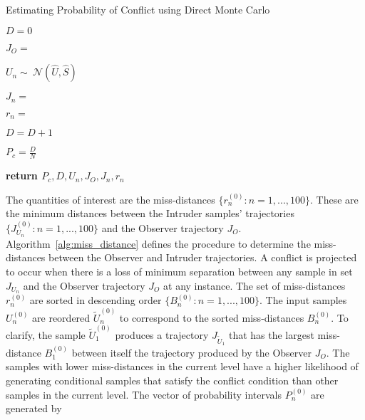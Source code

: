 \documentclass[journal]{IEEEtran}
\begin{document}
\begin{algorithm}[!t]
\caption{Estimating Probability of Conflict using Direct Monte Carlo}
\label{alg:pc_dmc}
	\begin{algorithmic}[1]
		
\State $D = 0$
		
		\State $J_{O} = $ 		

			\State $U_{n} \sim{~}\mathcal{N}(\hat{U},\hat{S})$

			\State $J_{n} = $ 

\State $r_{n} = $ 

					\State $D=D+1$
			\EndIf
		\EndFor
		
\State $P_{c} = \frac{D}{N}$
		
\State \textbf{return $P_{c}, D, U_{n}, J_{O}, J_{n}, r_{n}$}
	\EndFunction
	\end{algorithmic}
\end{algorithm}

The quantities of interest are the miss-distances $\{r_{n}^{(0)}: n = 1,...,100\}$. These are the minimum distances between the Intruder samples' trajectories $\{J_{U_{n}}^{(0)}: n = 1,...,100\}$ and the Observer trajectory $J_{O}$. Algorithm~\ref{alg:miss_distance} defines the procedure to determine the miss-distances between the Observer and Intruder trajectories. A conflict is projected to occur when there is a loss of minimum separation between any sample in set $J_{U_{n}}$ and the Observer trajectory $J_{O}$ at any instance. The set of miss-distances $r_{n}^{(0)}$ are sorted in descending order $\{B_{n}^{(0)}: n = 1,...,100\}$. The input samples $U_{n}^{(0)}$ are reordered $\tilde{U}_{n}^{(0)}$ to correspond to the sorted miss-distances $B_{n}^{(0)}$. To clarify, the sample $\tilde{U}_{1}^{(0)}$ produces a trajectory $J_{\tilde{U}_{1}}$ that has the largest miss-distance $B_{1}^{(0)}$ between itself the trajectory produced by the Observer $J_{O}$. The samples with lower miss-distances in the current level have a higher likelihood of generating conditional samples that satisfy the conflict condition than other samples in the current level. The vector of probability intervals $P_{n}^{(0)}$ are generated by
\end{document}
